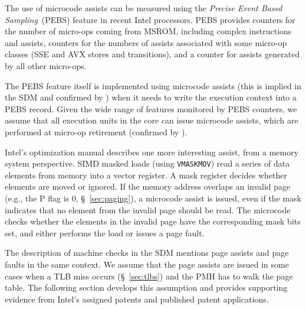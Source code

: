 
The use of microcode assists can be measured using the \textit{Precise Event
Based Sampling}~(PEBS) feature in recent Intel processors. PEBS provides
counters for the number of micro-ops coming from MSROM, including complex
instructions and assists, counters for the numbers of assists associated with
some micro-op classes (SSE and AVX stores and transitions), and a counter for
assists generated by all other micro-ops.

The PEBS feature itself is implemented using microcode assists (this is implied
in the SDM and confirmed by \cite{intel2014pebs}) when it needs to write the
execution context into a PEBS record. Given the wide range of features
monitored by PEBS counters, we assume that all execution units in the core can
issue microcode assists, which are performed at micro-op retirement (confirmed
by \cite{intel1997events}).


Intel's optimization manual describes one more interesting assist, from a
memory system perspective. SIMD masked loads (using \texttt{VMASKMOV}) read a
series of data elements from memory into a vector register. A mask register
decides whether elements are moved or ignored. If the memory address overlaps
an invalid page (e.g., the P flag is 0, \S~\ref{sec:paging}), a microcode
assist is issued, even if the mask indicates that no element from the invalid
page should be read. The microcode checks whether the elements in the invalid
page have the corresponding mask bits set, and either performs the load or
issues a page fault.


The description of machine checks in the SDM mentions page assists and page
faults in the same context. We assume that the page assists are issued in some
cases when a TLB miss occurs (\S~\ref{sec:tlbs}) and the PMH has to walk the
page table. The following section develops this assumption and provides
supporting evidence from Intel's assigned patents and published patent
applications.


\label{sec:microcode_structure}


